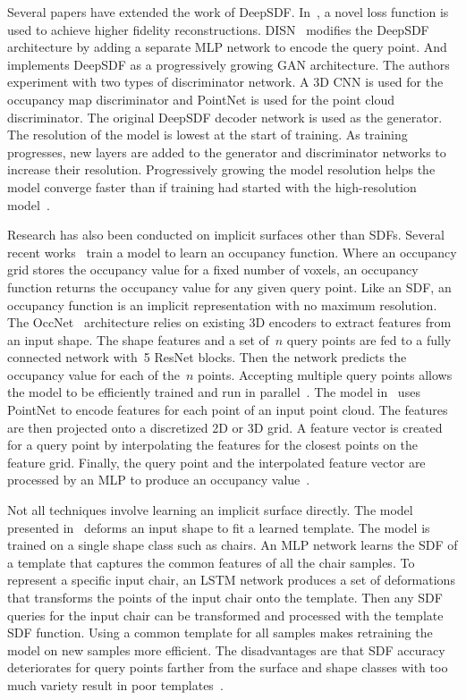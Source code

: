 Several papers have extended the work of DeepSDF. In~\cite{Gropp2020}, a novel loss function is used to achieve higher fidelity reconstructions. DISN~\cite{Wang2019} modifies the DeepSDF architecture by adding a separate MLP network to encode the query point. And~\cite{Kleineberg2020} implements DeepSDF as a progressively growing GAN architecture. The authors experiment with two types of discriminator network. A 3D CNN is used for the occupancy map discriminator and PointNet is used for the point cloud discriminator. The original DeepSDF decoder network is used as the generator. The resolution of the model is lowest at the start of training. As training progresses, new layers are added to the generator and discriminator networks to increase their resolution. Progressively growing the model resolution helps the model converge faster than if training had started with the high-resolution model~\cite{Kleineberg2020}.

Research has also been conducted on implicit surfaces other than SDFs. Several recent works~\cite{Mescheder2019, Peng2020} train a model to learn an occupancy function. Where an occupancy grid stores the occupancy value for a fixed number of voxels, an occupancy function returns the occupancy value for any given query point. Like an SDF, an occupancy function is an implicit representation with no maximum resolution. The OccNet~\cite{Mescheder2019} architecture relies on existing 3D encoders to extract features from an input shape. The shape features and a set of~$n$ query points are fed to a fully connected network with~5 ResNet blocks. Then the network predicts the occupancy value for each of the~$n$ points. Accepting multiple query points allows the model to be efficiently trained and run in parallel~\cite{Mescheder2019}. The model in~\cite{Peng2020} uses PointNet to encode features for each point of an input point cloud. The features are then projected onto a discretized 2D or 3D grid. A feature vector is created for a query point by interpolating the features for the closest points on the feature grid. Finally, the query point and the interpolated feature vector are processed by an MLP to produce an occupancy value~\cite{Peng2020}.

Not all techniques involve learning an implicit surface directly. The model presented in~\cite{Zheng2021} deforms an input shape to fit a learned template. The model is trained on a single shape class such as chairs. An MLP network learns the SDF of a template that captures the common features of all the chair samples. To represent a specific input chair, an LSTM network produces a set of deformations that transforms the points of the input chair onto the template. Then any SDF queries for the input chair can be transformed and processed with the template SDF function. Using a common template for all samples makes retraining the model on new samples more efficient. The disadvantages are that SDF accuracy deteriorates for query points farther from the surface and shape classes with too much variety result in poor templates~\cite{Zheng2021}.

